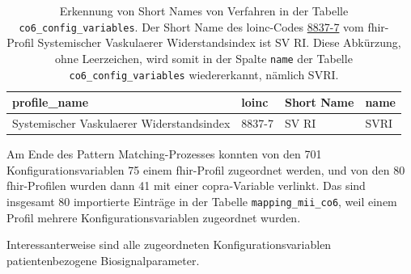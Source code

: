 \begin{table}[ht]
	\centering 
	\caption[Erkennung von \glqq Short Names\grqq{} von Verfahren in der Tabelle \\ co6\_config\_variables]{Erkennung von \glqq Short Names\grqq{} von Verfahren in der Tabelle \texttt{co6\_config\_variables}. Der \glqq Short Name\grqq{} des \ac{loinc}-Codes \href{https://loinc.org/8837-7/}{8837-7} vom \ac{fhir}-Profil \glqq Systemischer Vaskulaerer Widerstandsindex\grqq{} ist \glqq SV RI\grqq{}. Diese Abkürzung, ohne Leerzeichen, wird somit in der Spalte \texttt{name} der Tabelle \texttt{co6\_config\_variables} wiedererkannt, nämlich SVRI.}
	\label{tab:shortnamepattern}
	\begin{tabular}{|p{4cm}|l|l|l|}
		\hline
		\bfseries profile\_name & \bfseries loinc & \bfseries Short Name & \bfseries name \\ \hline
		Systemischer Vaskulaerer Widerstandsindex & 8837-7 & SV RI & SVRI \\ \hline 
	\end{tabular}
\end{table}

Am Ende des Pattern Matching-Prozesses konnten von den 701 Konfigurationsvariablen 75 einem \ac{fhir}-Profil zugeordnet werden, und von den 80 \ac{fhir}-Profilen wurden dann 41 mit einer \ac{copra}-Variable verlinkt. Das sind insgesamt 80 importierte Einträge in der Tabelle \texttt{mapping\_mii\_co6}, weil einem Profil mehrere Konfigurationsvariablen zugeordnet wurden. 

Interessanterweise sind alle zugeordneten Konfigurationsvariablen patientenbezogene Biosignalparameter. 